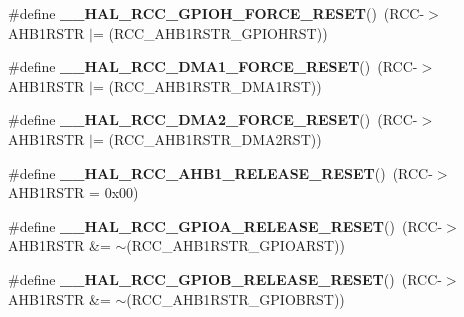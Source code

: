 \begin{DoxyCompactItemize}
\item 
\#define {\bfseries \+\_\+\+\_\+\+H\+A\+L\+\_\+\+R\+C\+C\+\_\+\+G\+P\+I\+O\+H\+\_\+\+F\+O\+R\+C\+E\+\_\+\+R\+E\+S\+ET}()~(R\+CC-\/$>$A\+H\+B1\+R\+S\+TR $\vert$= (R\+C\+C\+\_\+\+A\+H\+B1\+R\+S\+T\+R\+\_\+\+G\+P\+I\+O\+H\+R\+ST))\hypertarget{group___r_c_c___a_h_b1___force___release___reset_ga4f05c575d762edf40a6d17f88671b68d}{}\label{group___r_c_c___a_h_b1___force___release___reset_ga4f05c575d762edf40a6d17f88671b68d}

\item 
\#define {\bfseries \+\_\+\+\_\+\+H\+A\+L\+\_\+\+R\+C\+C\+\_\+\+D\+M\+A1\+\_\+\+F\+O\+R\+C\+E\+\_\+\+R\+E\+S\+ET}()~(R\+CC-\/$>$A\+H\+B1\+R\+S\+TR $\vert$= (R\+C\+C\+\_\+\+A\+H\+B1\+R\+S\+T\+R\+\_\+\+D\+M\+A1\+R\+ST))\hypertarget{group___r_c_c___a_h_b1___force___release___reset_ga9135dece327ecc27f333f86dcf3ba8ee}{}\label{group___r_c_c___a_h_b1___force___release___reset_ga9135dece327ecc27f333f86dcf3ba8ee}

\item 
\#define {\bfseries \+\_\+\+\_\+\+H\+A\+L\+\_\+\+R\+C\+C\+\_\+\+D\+M\+A2\+\_\+\+F\+O\+R\+C\+E\+\_\+\+R\+E\+S\+ET}()~(R\+CC-\/$>$A\+H\+B1\+R\+S\+TR $\vert$= (R\+C\+C\+\_\+\+A\+H\+B1\+R\+S\+T\+R\+\_\+\+D\+M\+A2\+R\+ST))\hypertarget{group___r_c_c___a_h_b1___force___release___reset_gaf0be736e6cdebf31eeded223acc25613}{}\label{group___r_c_c___a_h_b1___force___release___reset_gaf0be736e6cdebf31eeded223acc25613}

\item 
\#define {\bfseries \+\_\+\+\_\+\+H\+A\+L\+\_\+\+R\+C\+C\+\_\+\+A\+H\+B1\+\_\+\+R\+E\+L\+E\+A\+S\+E\+\_\+\+R\+E\+S\+ET}()~(R\+CC-\/$>$A\+H\+B1\+R\+S\+TR = 0x00)\hypertarget{group___r_c_c___a_h_b1___force___release___reset_ga23b6a1e77c4f045c29cc36a4b1e910b0}{}\label{group___r_c_c___a_h_b1___force___release___reset_ga23b6a1e77c4f045c29cc36a4b1e910b0}

\item 
\#define {\bfseries \+\_\+\+\_\+\+H\+A\+L\+\_\+\+R\+C\+C\+\_\+\+G\+P\+I\+O\+A\+\_\+\+R\+E\+L\+E\+A\+S\+E\+\_\+\+R\+E\+S\+ET}()~(R\+CC-\/$>$A\+H\+B1\+R\+S\+TR \&= $\sim$(R\+C\+C\+\_\+\+A\+H\+B1\+R\+S\+T\+R\+\_\+\+G\+P\+I\+O\+A\+R\+ST))\hypertarget{group___r_c_c___a_h_b1___force___release___reset_gad56e47c2eacd972491f94296053d0cc3}{}\label{group___r_c_c___a_h_b1___force___release___reset_gad56e47c2eacd972491f94296053d0cc3}

\item 
\#define {\bfseries \+\_\+\+\_\+\+H\+A\+L\+\_\+\+R\+C\+C\+\_\+\+G\+P\+I\+O\+B\+\_\+\+R\+E\+L\+E\+A\+S\+E\+\_\+\+R\+E\+S\+ET}()~(R\+CC-\/$>$A\+H\+B1\+R\+S\+TR \&= $\sim$(R\+C\+C\+\_\+\+A\+H\+B1\+R\+S\+T\+R\+\_\+\+G\+P\+I\+O\+B\+R\+ST))\hypertarget{group___r_c_c___a_h_b1___force___release___reset_gaf03da3b36478071844fbd77df618a686}{}\label{group___r_c_c___a_h_b1___force___release___reset_gaf03da3b36478071844fbd77df618a686}


\end{DoxyCompactItemize}
